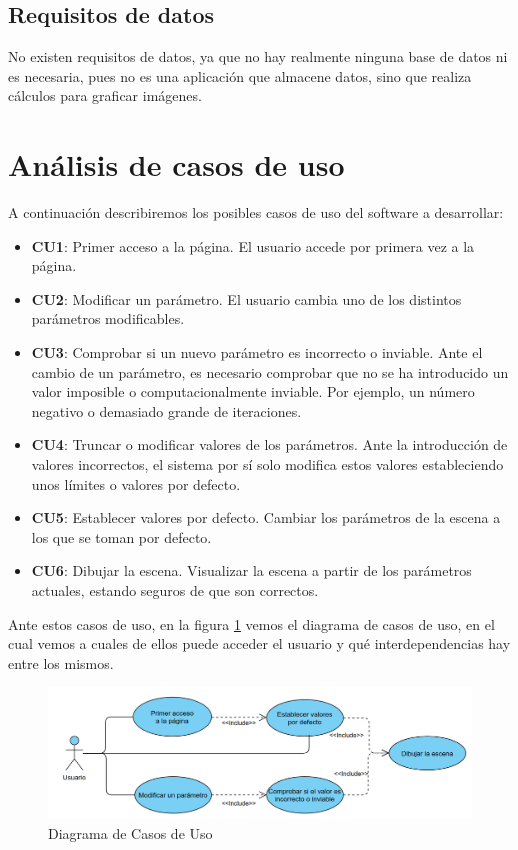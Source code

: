 \subsection{Requisitos de datos}

No existen requisitos de datos, ya que no hay realmente ninguna base de datos ni es necesaria, pues no es una aplicación que almacene datos, sino que realiza cálculos para graficar imágenes.

\section{Análisis de casos de uso}

A continuación describiremos los posibles casos de uso del software a desarrollar:
\begin{itemize}
    \item \textbf{CU1}: Primer acceso a la página. El usuario accede por primera vez a la página.
    \item \textbf{CU2}: Modificar un parámetro. El usuario cambia uno de los distintos parámetros modificables.
    \item \textbf{CU3}: Comprobar si un nuevo parámetro es incorrecto o inviable. Ante el cambio de un parámetro, es necesario comprobar que no se ha introducido un valor imposible o computacionalmente inviable. Por ejemplo, un número negativo o demasiado grande de iteraciones.
    \item \textbf{CU4}: Truncar o modificar valores de los parámetros. Ante la introducción de valores incorrectos, el sistema por sí solo modifica estos valores estableciendo unos límites o valores por defecto.
    \item \textbf{CU5}: Establecer valores por defecto. Cambiar los parámetros de la escena a los que se toman por defecto.
    \item \textbf{CU6}: Dibujar la escena. Visualizar la escena a partir de los parámetros actuales, estando seguros de que son correctos.
\end{itemize}

Ante estos casos de uso, en la figura \ref{fig:casos-uso} vemos el diagrama de casos de uso, en el cual vemos a cuales de ellos puede acceder el usuario y qué interdependencias hay entre los mismos.

\begin{figure} [ht]
\centering
\includegraphics[width=15cm]{img/diagrama-CU.png}
\caption{Diagrama de Casos de Uso}
    \label{fig:casos-uso}
\end{figure}

